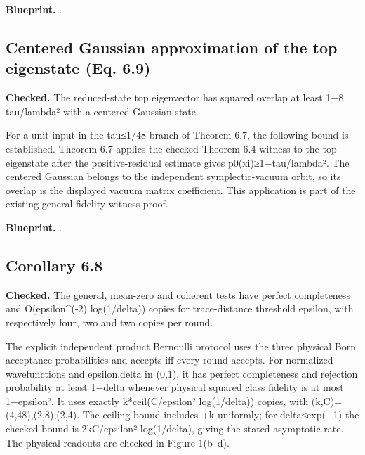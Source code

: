 
\textbf{Blueprint.} .

\subsection{Centered Gaussian approximation of the top eigenstate (Eq. 6.9)}\label{paper:boson-centered-approximation}
\textbf{Checked.} The reduced-state top eigenvector has squared overlap at least 1−8 tau/lambda² with a centered Gaussian state. 

For a unit input in the tau≤1/48 branch of Theorem 6.7, the following bound is established. Theorem 6.7 applies the checked Theorem 6.4 witness to the top eigenstate after the positive-residual estimate gives p0(xi)≥1−tau/lambda². The centered Gaussian belongs to the independent symplectic-vacuum orbit, so its overlap is the displayed vacuum matrix coefficient. This application is part of the existing general-fidelity witness proof.


\textbf{Blueprint.} .

\subsection{Corollary 6.8}\label{paper:r6-8}
\textbf{Checked.} The general, mean-zero and coherent tests have perfect completeness and O(epsilon\textasciicircum{}(-2) log(1/delta)) copies for trace-distance threshold epsilon, with respectively four, two and two copies per round. 

The explicit independent product Bernoulli protocol uses the three physical Born acceptance probabilities and accepts iff every round accepts. For normalized wavefunctions and epsilon,delta in (0,1), it has perfect completeness and rejection probability at least 1−delta whenever physical squared class fidelity is at most 1−epsilon². It uses exactly k*ceil(C/epsilon² log(1/delta)) copies, with (k,C)=(4,48),(2,8),(2,4). The ceiling bound includes +k uniformly; for delta≤exp(−1) the checked bound is 2kC/epsilon² log(1/delta), giving the stated asymptotic rate. The physical readouts are checked in Figure 1(b–d).

